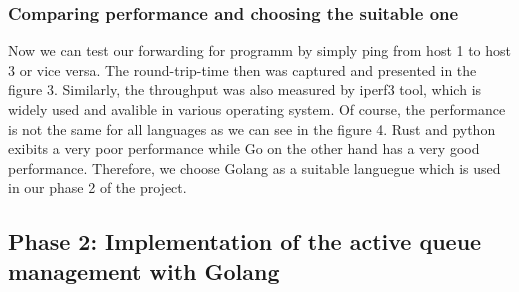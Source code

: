 \subsubsection{Comparing performance and choosing the suitable one}
Now we can test our forwarding for programm by simply ping from host 1 to host 3 or vice versa. The round-trip-time then was captured and presented in the figure 3. Similarly, the throughput was also measured by iperf3 tool, which is widely used and avalible in various operating system. Of course, the performance is not the same for all languages as we can see in the figure 4. Rust and python exibits a very poor performance while Go on the other hand has a very good performance. Therefore, we choose Golang as a suitable languegue which is used in our phase 2 of the project.





\subsection{Phase 2: Implementation of the active queue management with Golang}
